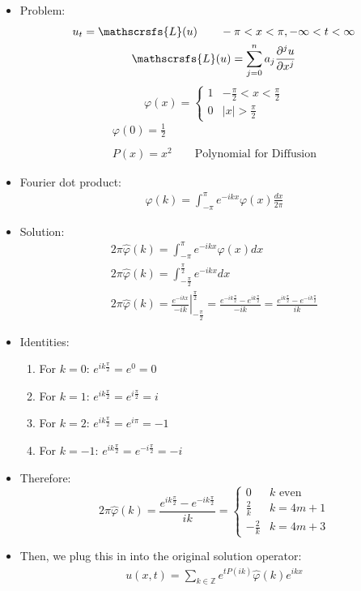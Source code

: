 \documentclass[12pt, a4paper]{article}
\begin{document}
\begin{itemize}
    \item Problem:
    \begin{gather*}
        u_t = \mathscrsfs{L}(u) \qquad -\pi<x<\pi, -\infty<t<\infty\\
    \mathscrsfs{L}(u)= \sum_{j=0}^{n} a_j \frac{\partial^j u}{\partial x^j}\\
    \end{gather*}
    \[ \varphi(x) = \begin{cases} 
        1 & -\frac{\pi}{2}<x< \frac{\pi}{2} \\
        0 & |x| > \frac{\pi}{2}
     \end{cases}\]
    \begin{gather*}
        \varphi(0) = \frac{1}{2}\\\\
        P(x) = x^2 \qquad \text{Polynomial for Diffusion}
    \end{gather*}
    \item Fourier dot product:
    \begin{gather*}
        \hat{\varphi}(k) = \int_{-\pi}^\pi e^{-ikx}\varphi(x) \frac{dx}{2\pi}
    \end{gather*}
    \item Solution:
    \begin{gather*}
        2\pi \hat{\varphi}(k) = \int_{-\pi}^\pi e^{-ikx}\varphi(x) dx\\
        2\pi \hat{\varphi}(k) = \int_{-\frac{\pi}{2}}^{\frac{\pi}{2}} e^{-ikx} dx \\
        2\pi \hat{\varphi}(k) = \left.\frac{e^{-ikx}}{-ik}\right\rvert_{-\frac{\pi}{2}}^{\frac{\pi}{2}} = \frac{e^{-ik\frac{\pi}{2}} - e^{ik\frac{\pi}{2}}}{-ik} = \frac{e^{ik\frac{\pi}{2}} - e^{-ik\frac{\pi}{2}}}{ik}
    \end{gather*}
    \item Identities:
    \begin{enumerate}
        \item For $k = 0$: $e^{ik\frac{\pi}{2}} = e^0 = 0$
        \item For $k = 1$: $e^{ik\frac{\pi}{2}} = e^{i\frac{\pi}{2}} = i$
        \item For $k = 2$: $e^{ik\frac{\pi}{2}} = e^{i\pi} = -1$
        \item For $k = -1$: $e^{ik\frac{\pi}{2}} = e^{-i\frac{\pi}{2}} = -i$
    \end{enumerate}
    \item Therefore:
    \[ 2\pi \hat{\varphi}(k)= \frac{e^{ik\frac{\pi}{2}} - e^{-ik\frac{\pi}{2}}}{ik} =  \begin{cases} 
        0 & k \text{ even} \\
        \frac{2}{k} & k = 4m+1\\
        -\frac{2}{k} & k =4m+3
    \end{cases}\]  
    \item Then, we plug this in into the original solution operator:
    \begin{gather*}
        u(x, t) = \sum_{k \in \mathbb{Z}} e^{tP(ik)}\hat{\varphi}(k)e^{ikx}
    \end{gather*}
\end{itemize}
\end{document}
